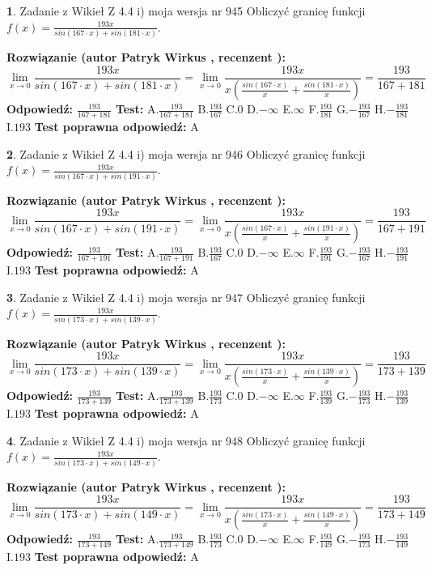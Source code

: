 \documentclass[12pt, a4paper]{article}
\theoremstyle{definition} %
\newtheorem{zad}{}
\newcommand{\zadStart}[1]{\begin{zad}#1\newline}
\newcommand{\zadStop}{\end{zad}}
\newcommand{\rozwStart}[2]{\noindent \textbf{Rozwiązanie (autor #1 , recenzent #2): }\newline}
\newcommand{\rozwStop}{\newline}
\newcommand{\odpStart}{\noindent \textbf{Odpowiedź:}\newline}
\newcommand{\odpStop}{\newline}
\newcommand{\testStart}{\noindent \textbf{Test:}\newline}
\newcommand{\testStop}{\newline}
\newcommand{\kluczStart}{\noindent \textbf{Test poprawna odpowiedź:}\newline}
\newcommand{\kluczStop}{\newline}
\begin{document}
\zadStart{Zadanie z Wikieł Z 4.4 i) moja wersja nr 945}
Obliczyć granicę funkcji $f(x)=\frac{193x}{sin(167\cdot x) +sin(181\cdot x)}$.
\zadStop
\rozwStart{Patryk Wirkus}{}
$$\lim\limits_{x\to 0}\frac{193x}{sin(167\cdot x) +sin(181\cdot x)}=\lim\limits_{x\to 0}\frac{193x}{x(\frac{sin(167\cdot x)}{x}+\frac{sin(181\cdot x)}{x})}=\frac{193}{167+181}$$
\rozwStop
\odpStart
$\frac{193}{167+181}$
\odpStop
\testStart
A.$\frac{193}{167+181}$
B.$\frac{193}{167}$
C.$0$
D.$-\infty$
E.$\infty$
F.$\frac{193}{181}$
G.$-\frac{193}{167}$
H.$-\frac{193}{181}$
I.$193$
\testStop
\kluczStart
A
\kluczStop



\zadStart{Zadanie z Wikieł Z 4.4 i) moja wersja nr 946}
Obliczyć granicę funkcji $f(x)=\frac{193x}{sin(167\cdot x) +sin(191\cdot x)}$.
\zadStop
\rozwStart{Patryk Wirkus}{}
$$\lim\limits_{x\to 0}\frac{193x}{sin(167\cdot x) +sin(191\cdot x)}=\lim\limits_{x\to 0}\frac{193x}{x(\frac{sin(167\cdot x)}{x}+\frac{sin(191\cdot x)}{x})}=\frac{193}{167+191}$$
\rozwStop
\odpStart
$\frac{193}{167+191}$
\odpStop
\testStart
A.$\frac{193}{167+191}$
B.$\frac{193}{167}$
C.$0$
D.$-\infty$
E.$\infty$
F.$\frac{193}{191}$
G.$-\frac{193}{167}$
H.$-\frac{193}{191}$
I.$193$
\testStop
\kluczStart
A
\kluczStop



\zadStart{Zadanie z Wikieł Z 4.4 i) moja wersja nr 947}
Obliczyć granicę funkcji $f(x)=\frac{193x}{sin(173\cdot x) +sin(139\cdot x)}$.
\zadStop
\rozwStart{Patryk Wirkus}{}
$$\lim\limits_{x\to 0}\frac{193x}{sin(173\cdot x) +sin(139\cdot x)}=\lim\limits_{x\to 0}\frac{193x}{x(\frac{sin(173\cdot x)}{x}+\frac{sin(139\cdot x)}{x})}=\frac{193}{173+139}$$
\rozwStop
\odpStart
$\frac{193}{173+139}$
\odpStop
\testStart
A.$\frac{193}{173+139}$
B.$\frac{193}{173}$
C.$0$
D.$-\infty$
E.$\infty$
F.$\frac{193}{139}$
G.$-\frac{193}{173}$
H.$-\frac{193}{139}$
I.$193$
\testStop
\kluczStart
A
\kluczStop



\zadStart{Zadanie z Wikieł Z 4.4 i) moja wersja nr 948}
Obliczyć granicę funkcji $f(x)=\frac{193x}{sin(173\cdot x) +sin(149\cdot x)}$.
\zadStop
\rozwStart{Patryk Wirkus}{}
$$\lim\limits_{x\to 0}\frac{193x}{sin(173\cdot x) +sin(149\cdot x)}=\lim\limits_{x\to 0}\frac{193x}{x(\frac{sin(173\cdot x)}{x}+\frac{sin(149\cdot x)}{x})}=\frac{193}{173+149}$$
\rozwStop
\odpStart
$\frac{193}{173+149}$
\odpStop
\testStart
A.$\frac{193}{173+149}$
B.$\frac{193}{173}$
C.$0$
D.$-\infty$
E.$\infty$
F.$\frac{193}{149}$
G.$-\frac{193}{173}$
H.$-\frac{193}{149}$
I.$193$
\testStop
\kluczStart
A
\kluczStop
\end{document}
